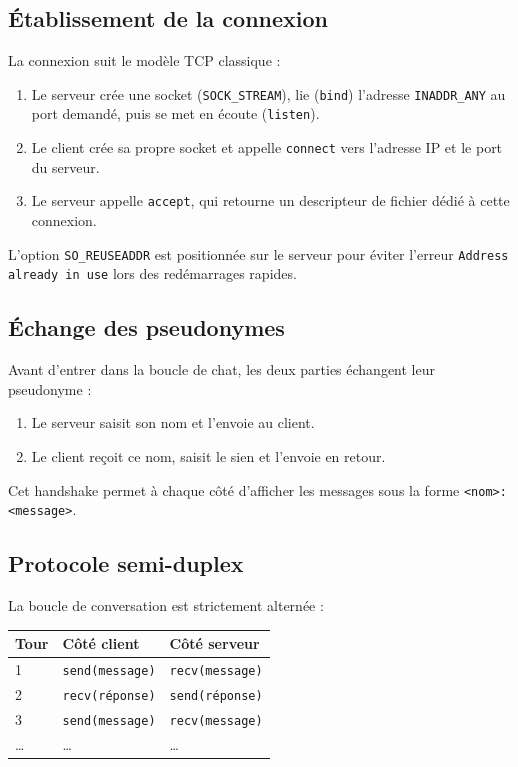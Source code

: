 \documentclass[12pt,a4paper]{article}
\begin{document}
\subsection{Établissement de la connexion}

La connexion suit le modèle TCP classique :

\begin{enumerate}
    \item Le serveur crée une socket (\texttt{SOCK\_STREAM}), lie
          (\texttt{bind}) l'adresse \texttt{INADDR\_ANY} au port demandé,
          puis se met en écoute (\texttt{listen}).
    \item Le client crée sa propre socket et appelle \texttt{connect} vers
          l'adresse IP et le port du serveur.
    \item Le serveur appelle \texttt{accept}, qui retourne un descripteur de
          fichier dédié à cette connexion.
\end{enumerate}

L'option \texttt{SO\_REUSEADDR} est positionnée sur le serveur pour éviter
l'erreur \texttt{Address already in use} lors des redémarrages rapides.

\subsection{Échange des pseudonymes}

Avant d'entrer dans la boucle de chat, les deux parties échangent leur
pseudonyme :

\begin{enumerate}
    \item Le serveur saisit son nom et l'envoie au client.
    \item Le client reçoit ce nom, saisit le sien et l'envoie en retour.
\end{enumerate}

Cet handshake permet à chaque côté d'afficher les messages sous la forme
\texttt{<nom>: <message>}.

\subsection{Protocole semi-duplex}

La boucle de conversation est strictement alternée :

\begin{center}
\begin{tabular}{@{}lll@{}}
\toprule
Tour & Côté client & Côté serveur \\
\midrule
1 & \texttt{send(message)} & \texttt{recv(message)} \\
2 & \texttt{recv(réponse)} & \texttt{send(réponse)} \\
3 & \texttt{send(message)} & \texttt{recv(message)} \\
\ldots & \ldots & \ldots \\
\bottomrule
\end{tabular}
\end{center}
\end{document}
